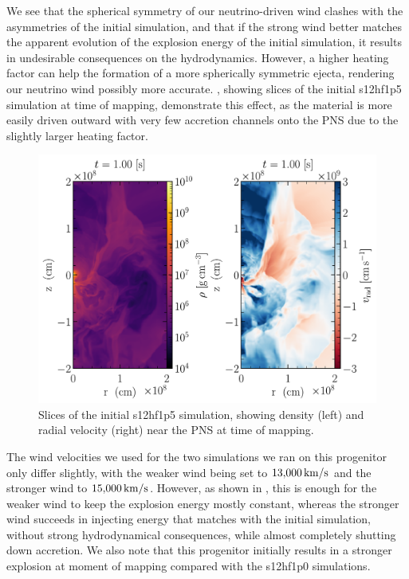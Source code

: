 We see that the spherical symmetry of our neutrino-driven wind clashes with the asymmetries of the initial simulation, and that if the strong wind better matches the apparent evolution of the explosion energy of the initial simulation, it results in undesirable consequences on the hydrodynamics. However, a higher heating factor can help the formation of a more spherically symmetric ejecta, rendering our neutrino wind possibly more accurate. , showing slices of the initial s12hf1p5 simulation at time of mapping, demonstrate this effect, as the material is more easily driven outward with very few accretion channels onto the PNS due to the slightly larger heating factor.

\begin{figure}
    \centering
    \includegraphics[width=1.0\linewidth]{figures/s12hf1p5_og.pdf}
    \caption{Slices of the initial s12hf1p5 simulation, showing density (left) and radial velocity (right) near the PNS at time of mapping.}
    \label{fig:s12hf1p5_og}
\end{figure}

The wind velocities we used for the two simulations we ran on this progenitor only differ slightly, with the weaker wind being set to \(13{,}000\,\mathrm{km/s}\) and the stronger wind to \(15{,}000\,\mathrm{km/s}\). However, as shown in , this is enough for the weaker wind to keep the explosion energy mostly constant, whereas the stronger wind succeeds in injecting energy that matches with the initial simulation, without strong hydrodynamical consequences, while almost completely shutting down accretion. We also note that this progenitor initially results in a stronger explosion at moment of mapping compared with the s12hf1p0 simulations.

